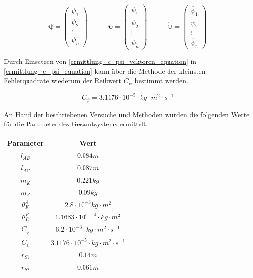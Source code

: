 \begin{equation}
\label{ermittlung_c_psi_vektoren_equation}
\boldsymbol{\psi} = \begin{pmatrix} \psi_1 \\ \psi_2 \\ \vdots \\ \psi_n \end{pmatrix} \hspace{35pt}
\boldsymbol{\dot{\psi}} = \begin{pmatrix}
\dot{\psi_1} \\ \dot{\psi_2} \\ \vdots \\ \dot{\psi_n}
\end{pmatrix} \hspace{35pt}
\boldsymbol{\ddot{\psi}} = \begin{pmatrix}
\ddot{\psi_1} \\ \ddot{\psi_2} \\ \vdots \\ \ddot{\psi_n}
\end{pmatrix}
\end{equation}

Durch Einsetzen von \ref{ermittlung_c_psi_vektoren_equation} in \ref{ermittlung_c_psi_equation} kann über die Methode der kleinsten Fehlerquadrate wiederum der Reibwert $C_\psi$ bestimmt werden.

\begin{equation}
C_{\psi}= 3.1176 \cdot 10^{-5} \cdot kg \cdot m^2 \cdot s^{-1}
\end{equation}

An Hand der beschriebenen Versuche und Methoden wurden die folgenden Werte für die Parameter des Gesamtsystems ermittelt.

\begin{table}[h]
\centering
\begin{tabular}{|c|c|}
	\hline
	\textbf{Parameter} & \textbf{Wert} \\ \hline
	$l_{AB}$ & $0.084m$\\ \hline
	$l_{AC}$ & $0.087m$ \\ \hline
	$m_K$ & $0.221kg$ \\ \hline
	$m_R$ & $0.09kg$ \\ \hline
	${\theta}^A_K$ & $2.8 \cdot 10^{-3}kg \cdot m^2$ \\ \hline
	${\theta}^B_R$ & $1.1683 \cdot 10^{e-4} \cdot kg \cdot m^2$ \\ \hline
	$C_{\varphi}$ & $6.2 \cdot 10^{-3} \cdot kg \cdot m^2 \cdot s^{-1}$ \\ \hline
	$C_{\psi}$ & $3.1176 \cdot 10^{-5} \cdot kg \cdot m^2 \cdot s^{-1}$ \\ \hline
	$r_{S1}$ & $0.14m$ \\ \hline
	$r_{S2}$ & $0.061m$ \\ \hline
\end{tabular}
\end{table}

